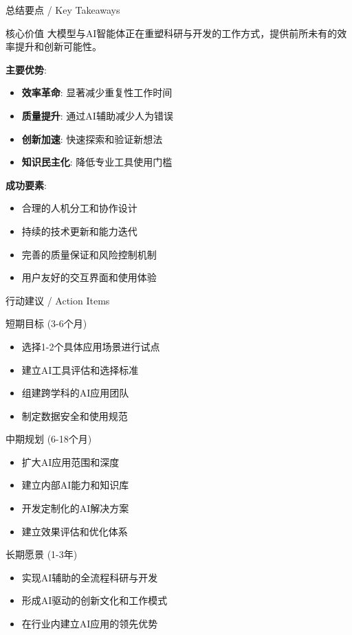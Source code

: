 \documentclass[aspectratio=169]{beamer}
\begin{document}
\begin{frame}{总结要点 / Key Takeaways}
\begin{block}{核心价值}
大模型与AI智能体正在重塑科研与开发的工作方式，提供前所未有的效率提升和创新可能性。
\end{block}

\textbf{主要优势}:
\begin{itemize}
    \item \textbf{效率革命}: 显著减少重复性工作时间
    \item \textbf{质量提升}: 通过AI辅助减少人为错误
    \item \textbf{创新加速}: 快速探索和验证新想法
    \item \textbf{知识民主化}: 降低专业工具使用门槛
\end{itemize}

\textbf{成功要素}:
\begin{itemize}
    \item 合理的人机分工和协作设计
    \item 持续的技术更新和能力迭代
    \item 完善的质量保证和风险控制机制
    \item 用户友好的交互界面和使用体验
\end{itemize}
\end{frame}

\begin{frame}{行动建议 / Action Items}
\begin{block}{短期目标 (3-6个月)}
\begin{itemize}
    \item 选择1-2个具体应用场景进行试点
    \item 建立AI工具评估和选择标准  
    \item 组建跨学科的AI应用团队
    \item 制定数据安全和使用规范
\end{itemize}
\end{block}

\begin{block}{中期规划 (6-18个月)}  
\begin{itemize}
    \item 扩大AI应用范围和深度
    \item 建立内部AI能力和知识库
    \item 开发定制化的AI解决方案
    \item 建立效果评估和优化体系
\end{itemize}
\end{block}

\begin{block}{长期愿景 (1-3年)}
\begin{itemize}
    \item 实现AI辅助的全流程科研与开发
    \item 形成AI驱动的创新文化和工作模式
    \item 在行业内建立AI应用的领先优势
\end{itemize}
\end{block}
\end{frame}
\end{document}
